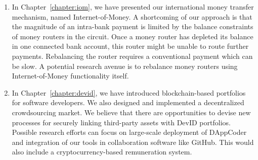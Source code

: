 \begin{enumerate}
	\item In Chapter~\ref{chapter:iom}, we have presented our international money transfer mechanism, named Internet-of-Money.
	A shortcoming of our approach is that the magnitude of an intra-bank payment is limited by the balance constraints of money routers in the circuit.
	Once a money router has depleted its balance in one connected bank account, this router might be unable to route further payments.
	Rebalancing the router requires a conventional payment which can be slow.
	A potential research avenue is to rebalance money routers using Internet-of-Money functionality itself.
	
	\item In Chapter~\ref{chapter:devid}, we have introduced blockchain-based portfolios for software developers.
	We also designed and implemented a decentralized crowdsourcing market.
	We believe that there are opportunities to devise new processes for securely linking third-party assets with DevID portfolios.
	Possible research efforts can focus on large-scale deployment of DAppCoder and integration of our tools in collaboration software like GitHub.
	This would also include a cryptocurrency-based remuneration system.
\end{enumerate}